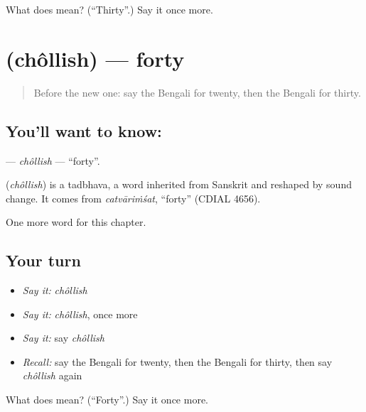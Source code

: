 \begin{tcolorbox}[breakable,colback=teal!4,colframe=teal!35!black,title={Before you move on}]
What does  mean? (\textquotedblleft{}Thirty\textquotedblright{}.) Say it once more.
\end{tcolorbox}
\section[\texorpdfstring{\bn{চল্লিশ} (chôllish)}{চল্লিশ (chôllish)}]{ (chôllish) — forty}

\label{lesson:BN-C87-chollish}



\begin{quote}
Before the new one: say the Bengali for twenty, then the Bengali for thirty.
\end{quote}

\subsection*{You'll want to know: }
\textbf{} — \emph{chôllish} — \textquotedblleft{}forty\textquotedblright{}.

\begin{cousinweb}
\textbf{} (\emph{chôllish}) is a tadbhava, a word inherited from Sanskrit and reshaped by sound change. It comes from \emph{catvāriṁśat}, \textquotedblleft{}forty\textquotedblright{} (CDIAL 4656).
\end{cousinweb}

\begin{grammarlens}[title={What you've built}]
One more word for this chapter.
\end{grammarlens}

\subsection*{Your turn}
\begin{itemize}
\raggedright
  \item \emph{Say it:} \emph{chôllish}
  \item \emph{Say it:} \emph{chôllish}, once more
  \item \emph{Say it:} say \emph{chôllish}
  \item \emph{Recall:} say the Bengali for twenty, then the Bengali for thirty, then say \emph{chôllish} again
\end{itemize}

\begin{tcolorbox}[breakable,colback=teal!4,colframe=teal!35!black,title={Before you move on}]
What does  mean? (\textquotedblleft{}Forty\textquotedblright{}.) Say it once more.
\end{tcolorbox}
